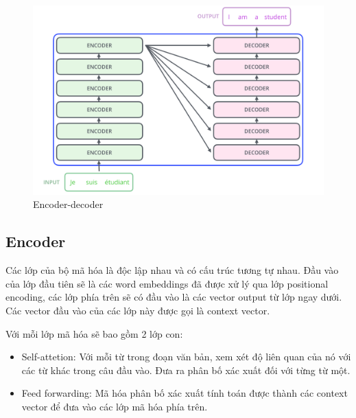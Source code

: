 \begin{figure}[H]
    \begin{center}
        \includegraphics[scale=0.35]{images/The_transformer_encoder_decoder_stack}
        \caption{Encoder-decoder}
        \label{fig:encoder-decoder-stack}
    \end{center}
\end{figure}



\subsection{Encoder}
Các lớp của bộ mã hóa là độc lập nhau và có cấu trúc tương tự nhau. Đầu vào của lớp đầu tiên sẽ là các word embeddings đã được xử lý qua lớp positional encoding, các lớp phía trên sẽ có đầu vào là các vector output từ lớp ngay dưới. Các vector đầu vào của các lớp này được gọi là context vector.

Với mỗi lớp mã hóa sẽ bao gồm 2 lớp con:
\begin{itemize}
	\item Self-attetion: Với mỗi từ trong đoạn văn bản, xem xét độ liên quan của nó với các từ khác trong câu đầu vào. Đưa ra phân bố xác xuất đối với từng từ một.
	\item Feed forwarding: Mã hóa phân bố xác xuất tính toán được thành các context vector để đưa vào các lớp mã hóa phía trên.
\end{itemize}

